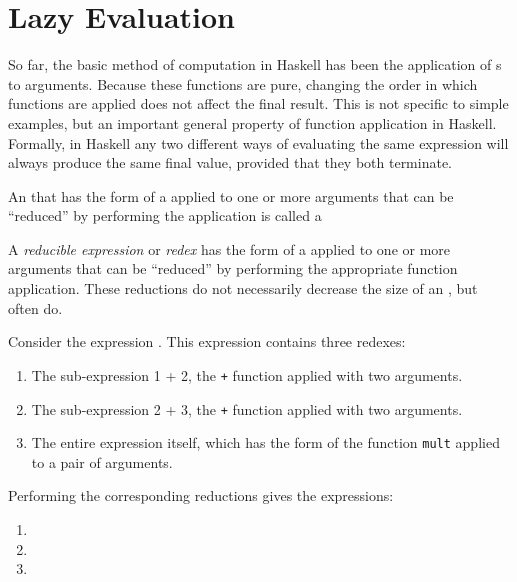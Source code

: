 \section{Lazy Evaluation}\label{sec:Lazy_Evaluation}
So far, the basic method of computation in Haskell has been the application of s to arguments.
Because these functions are pure, changing the order in which functions are applied does not affect the final result.
This is not specific to simple examples, but an important general property of function application in Haskell.
Formally, in Haskell any two different ways of evaluating the same expression will always produce the same final value, provided that they both terminate.

An  that has the form of a  applied to one or more arguments that can be ``reduced'' by performing the application is called a 

\begin{definition}\label{def:Reducible_Expression}
  A \emph{reducible expression} or \emph{redex} has the form of a  applied to one or more arguments that can be ``reduced'' by performing the appropriate function application.
  These reductions do not necessarily decrease the size of an , but often do.
\end{definition}

Consider the expression .
This expression contains three redexes:
\begin{enumerate}[noitemsep]
\item The sub-expression 1 + 2, the \texttt{+} function applied with two arguments.
\item The sub-expression 2 + 3, the \texttt{+} function applied with two arguments.
\item The entire expression itself, which has the form of the function \texttt{mult} applied to a pair of arguments.
\end{enumerate}

Performing the corresponding reductions gives the expressions:
\begin{enumerate}[noitemsep]
\item {}
\item {}
\item {}
\end{enumerate}

